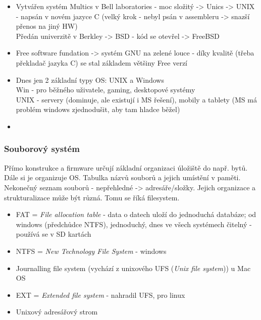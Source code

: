 \documentclass[12pt]{article}
\begin{document}
\begin{itemize}
\item Vytvářen systém Multics  v Bell laboratories - moc složitý -> Unics -> UNIX - napsán v novém jazyce C (velký krok - nebyl psán v assembleru -> snazší přenos na jiný HW)\\
Předán univerzitě v Berkley -> BSD - kód se otevřel -> FreeBSD
\item Free software fundation -> systém GNU na zelené louce - díky kvalitě (třeba překladač jazyka C) se stal základem většiny Free verzí
\item Dnes jen 2 základní typy OS: UNIX a Windows\\
Win - pro běžného uživatele, gaming, desktopové systémy\\
UNIX - servery (dominuje, ale existují i MS řešení), mobily a tablety (MS má problém windows zjednodušit, aby tam hladce běžel)
\item
\end{itemize}

\subsubsection{Souborový systém}
Přímo konstrukce a firmware určují základní organizaci úložiště do např. bytů. Dále si je organizuje OS. Tabulka názvů souborů a jejich umístění v paměti. Nekonečný seznam souborů - nepřehledné -> adresáře/složky. Jejich organizace a strukturalizace může být různá. Tomu se říká filesystem.
\begin{itemize}
\item FAT  = \emph{File allocation table} - data o datech uloží do jednoduchá databáze; od windows (předchůdce NTFS), jednoduchý, dnes ve všech systémech čitelný - používá se v SD kartách
\item NTFS = \emph{New Technology File System} - windows
\item Journalling file system (vychází z unixového UFS (\emph{Unix file system})) u Mac OS
\item EXT = \emph{Extended file system} - nahradil  UFS, pro linux
\item Unixový adresářový strom
\end{itemize}
\end{document}
